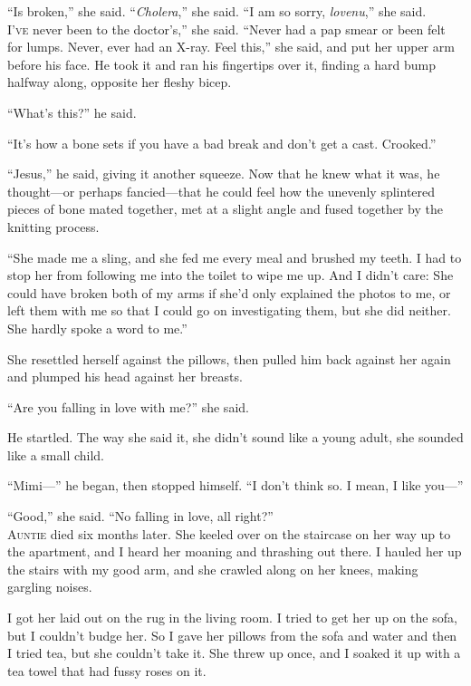 \documentclass{article}
\begin{document}
``Is broken,'' she said.  ``\textit{Cholera},'' she said.  ``I am so
sorry, \textit{lovenu},'' she said.
\\
\lettrine[lines=3, lhang=.5, nindent=0pt, findent=2pt]{I}{'ve}
never been to the doctor's,'' she said.  ``Never had a pap
smear or been felt for lumps.  Never, ever had an X-ray.  Feel this,''
she said, and put her upper arm before his face.  He took it and ran
his fingertips over it, finding a hard bump halfway along, opposite
her fleshy bicep.

``What's this?'' he said.

``It's how a bone sets if you have a bad break and don't get a cast. 
Crooked.''

``Jesus,'' he said, giving it another squeeze.  Now that he knew what
it was, he thought---or perhaps fancied---that he could feel how the
unevenly splintered pieces of bone mated together, met at a slight
angle and fused together by the knitting process.

``She made me a sling, and she fed me every meal and brushed my teeth. 
I had to stop her from following me into the toilet to wipe me up. 
And I didn't care:  She could have broken both of my arms if she'd
only explained the photos to me, or left them with me so that I could
go on investigating them, but she did neither.  She hardly spoke a
word to me.''

She resettled herself against the pillows, then pulled him back
against her again and plumped his head against her breasts.

``Are you falling in love with me?'' she said.

He startled.  The way she said it, she didn't sound like a young
adult, she sounded like a small child.

``Mimi---'' he began, then stopped himself.  ``I don't think so.  I
mean, I like you---''

``Good,'' she said.  ``No falling in love, all right?''
\\
\lettrine[lines=3, lhang=.5, nindent=0pt, findent=2pt]{A}{untie} died six months later.  She keeled over on the staircase on her
way up to the apartment, and I heard her moaning and thrashing out
there.  I hauled her up the stairs with my good arm, and she crawled
along on her knees, making gargling noises.

I got her laid out on the rug in the living room.  I tried to get her
up on the sofa, but I couldn't budge her.  So I gave her pillows from
the sofa and water and then I tried tea, but she couldn't take it. 
She threw up once, and I soaked it up with a tea towel that had fussy
roses on it.
\end{document}
